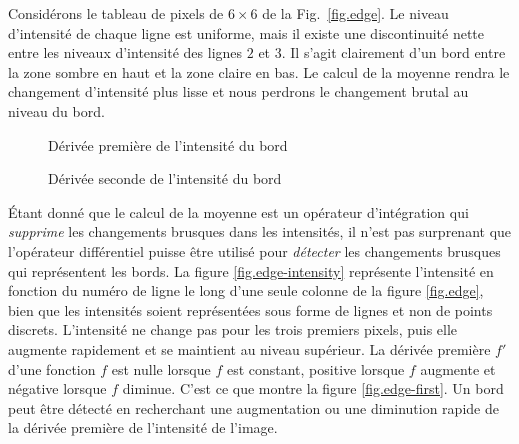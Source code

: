 Considérons le tableau de pixels de $6 \times 6$ de la Fig.~\ref{fig.edge}. Le niveau d'intensité de chaque ligne est uniforme, mais il existe une discontinuité nette entre les niveaux d'intensité des lignes $2$ et $3$. Il s'agit clairement d'un bord entre la zone sombre en haut et la zone claire en bas. Le calcul de la moyenne rendra le changement d'intensité plus lisse et nous perdrons le changement brutal au niveau du bord.

\begin{figure}
\begin{minipage}{.5\textwidth}
\caption{Dérivée première de l'intensité du bord}
\label{fig.edge-first}
\end{minipage}
\hspace{\fill}
\begin{minipage}{.5\textwidth}
\caption{Dérivée seconde de l'intensité du bord}
\label{fig.edge-second}
\end{minipage}
\end{figure}

Étant donné que le calcul de la moyenne est un opérateur d'intégration qui \emph{supprime} les changements brusques dans les intensités, il n'est pas surprenant que l'opérateur différentiel puisse être utilisé pour \emph{détecter} les changements brusques qui représentent les bords. La figure \ref{fig.edge-intensity} représente l'intensité en fonction du numéro de ligne le long d'une seule colonne de la figure \ref{fig.edge}, bien que les intensités soient représentées sous forme de lignes et non de points discrets. L'intensité ne change pas pour les trois premiers pixels, puis elle augmente rapidement et se maintient au niveau supérieur. La dérivée première $f'$ d'une fonction $f$ est nulle lorsque $f$ est constant, positive lorsque $f$ augmente et négative lorsque $f$ diminue. C'est ce que montre la figure \ref{fig.edge-first}. Un bord peut être détecté en recherchant une augmentation ou une diminution rapide de la dérivée première de l'intensité de l'image.

